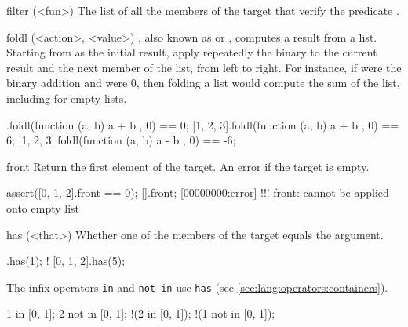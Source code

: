 \begin{urbiscriptapi}
\item[filter](<fun>)
  The list of all the members of the target that verify the predicate
  .


\item[foldl](<action>, <value>)
  ,
  also known as  or , computes a result
  from a list.  Starting from  as the initial result, apply
  repeatedly the binary  to the current result and the
  next member of the list, from left to right.  For instance, if
   were the binary addition and  were 0, then
  folding a list would compute the sum of the list, including for
  empty lists.

\begin{urbiassert}
       [].foldl(function (a, b) { a + b }, 0) == 0;
[1, 2, 3].foldl(function (a, b) { a + b }, 0) == 6;
[1, 2, 3].foldl(function (a, b) { a - b }, 0) == -6;
\end{urbiassert}

\item[front]
  Return the first element of the target. An error if the target is
  empty.
\begin{urbiscript}
assert([0, 1, 2].front == 0);
[].front;
[00000000:error] !!! front: cannot be applied onto empty list
\end{urbiscript}

\item[has](<that>)
  Whether one of the members of the target equals the argument.

\begin{urbiassert}
[0, 1, 2].has(1);
! [0, 1, 2].has(5);
\end{urbiassert}

  The infix operators \lstinline|in| and \lstinline|not in| use
  \lstinline|has| (see \autoref{sec:lang:operators:containers}).

\begin{urbiassert}
  1 in     [0, 1];
  2 not in [0, 1];
!(2 in     [0, 1]);
!(1 not in [0, 1]);
\end{urbiassert}


\end{urbiscriptapi}
